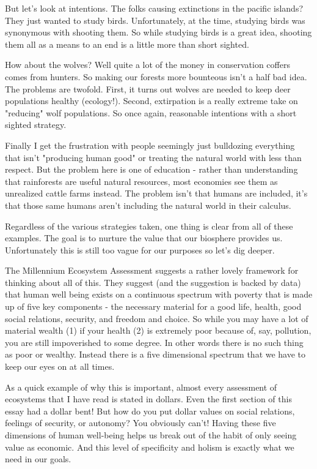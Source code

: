 \documentclass[11pt,a5paper]{book}
\begin{document}
But let's look at intentions. The folks causing extinctions in the pacific islands? They just wanted to study birds. Unfortunately, at the time, studying birds was synonymous with shooting them. So while studying birds is a great idea, shooting them all as a means to an end is a little more than short sighted. 

How about the wolves? Well quite a lot of the money in conservation coffers comes from hunters. So making our forests more bounteous isn't a half bad idea. The problems are twofold. First, it turns out wolves are needed to keep deer populations healthy (ecology!). Second, extirpation is a really extreme take on "reducing" wolf populations. So once again, reasonable intentions with a short sighted strategy.

Finally I get the frustration with people seemingly just bulldozing everything that isn't "producing human good" or treating the natural world with less than respect. But the problem here is one of education - rather than understanding that rainforests are useful natural resources, most economies see them as unrealized cattle farms instead. The problem isn't that humans are included, it's that those same humans aren't including the natural world in their calculus. 

Regardless of the various strategies taken, one thing is clear from all of these examples. The goal is to nurture the value that our biosphere provides us. Unfortunately this is still too vague for our purposes so let's dig deeper.
\newline

The Millennium Ecosystem Assessment \cite{mes} suggests a rather lovely framework for thinking about all of this. They suggest (and the suggestion is backed by data) that human well being exists on a continuous spectrum with poverty that is made up of five key components - the necessary material for a good life, health, good social relations, security, and freedom and choice. So while you may have a lot of material wealth (1) if your health (2) is extremely poor because of, say, pollution, you are still impoverished to some degree. In other words there is no such thing as poor or wealthy. Instead there is a five dimensional spectrum that we have to keep our eyes on at all times. 

As a quick example of why this is important, almost every assessment of ecosystems that I have read is stated in dollars. Even the first section of this essay had a dollar bent! But how do you put dollar values on social relations, feelings of security, or autonomy? You obviously can't! Having these five dimensions of human well-being helps us break out of the habit of only seeing value as economic. And this level of specificity and holism is exactly what we need in our goals.
\newline
\end{document}
